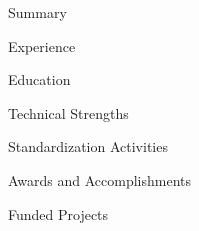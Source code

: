 \documentclass{resume}
\begin{document}

\begin{rSection}{Summary}

\end{rSection}


\begin{rSection}{Experience}

\end{rSection}


\begin{rSection}{Education}

\end{rSection}


\begin{rSection}{Technical Strengths}

\end{rSection}


\begin{rSection}{Standardization Activities}

\end{rSection}


\begin{rSection}{Awards and Accomplishments}

\end{rSection}

\begin{rSection}{Funded Projects}

\end{rSection}

\end{document}
